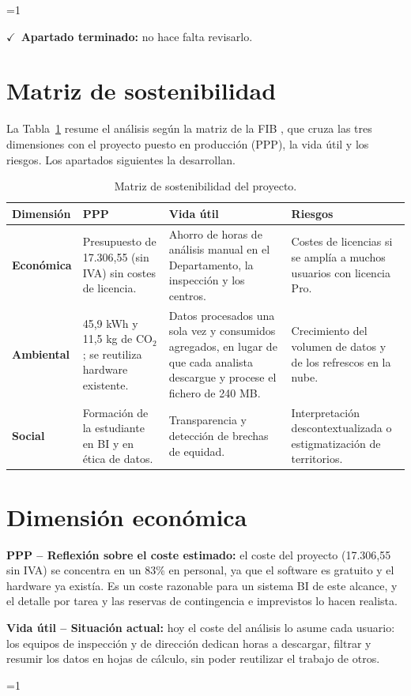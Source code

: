 \documentclass[12pt, a4paper, oneside]{report}
\newcommand{\mostrarterminados}{1}
\newenvironment{revisado}
  {\ifnum\mostrarterminados=1\relax\begin{cajarevisada}\noindent\colorbox{verdeterminado}{\parbox{\dimexpr\linewidth-2\fboxsep\relax}{\small$\checkmark$\ \textbf{Apartado terminado:} no hace falta revisarlo.}}\par\medskip\fi}
  {\ifnum\mostrarterminados=1\relax\end{cajarevisada}\fi}
\begin{document}
\begin{revisado}
\section{Matriz de sostenibilidad}
La Tabla~\ref{tab:matriz_sost} resume el análisis según la matriz de la FIB \cite{fib_sostenibilitat}, que cruza las tres dimensiones con el proyecto puesto en producción (PPP), la vida útil y los riesgos. Los apartados siguientes la desarrollan.

\begin{table}[H]
\centering
\small
\renewcommand{\arraystretch}{1.1}
\setlength{\tabcolsep}{3pt}
\begin{tabularx}{\textwidth}{@{} p{2.0cm} X X X @{}}
\toprule
\textbf{Dimensión} & \textbf{PPP} & \textbf{Vida útil} & \textbf{Riesgos} \\ \midrule
\textbf{Económica} & Presupuesto de 17.306,55 \texteuro{} (sin IVA) sin costes de licencia. & Ahorro de horas de análisis manual en el Departamento, la inspección y los centros. & Costes de licencias si se amplía a muchos usuarios con licencia Pro. \\ \addlinespace
\textbf{Ambiental} & 45,9 kWh y 11,5 kg de CO$_2$; se reutiliza hardware existente. & Datos procesados una sola vez y consumidos agregados, en lugar de que cada analista descargue y procese el fichero de 240 MB. & Crecimiento del volumen de datos y de los refrescos en la nube. \\ \addlinespace
\textbf{Social} & Formación de la estudiante en BI y en ética de datos. & Transparencia y detección de brechas de equidad. & Interpretación descontextualizada o estigmatización de territorios. \\ \bottomrule
\end{tabularx}
\caption{Matriz de sostenibilidad del proyecto.}
\label{tab:matriz_sost}
\end{table}

\section{Dimensión económica}
\textbf{PPP -- Reflexión sobre el coste estimado:} el coste del proyecto (17.306,55 \texteuro{} sin IVA) se concentra en un 83\% en personal, ya que el software es gratuito y el hardware ya existía. Es un coste razonable para un sistema BI de este alcance, y el detalle por tarea y las reservas de contingencia e imprevistos lo hacen realista.

\textbf{Vida útil -- Situación actual:} hoy el coste del análisis lo asume cada usuario: los equipos de inspección y de dirección dedican horas a descargar, filtrar y resumir los datos en hojas de cálculo, sin poder reutilizar el trabajo de otros.


\end{revisado}
\end{document}
